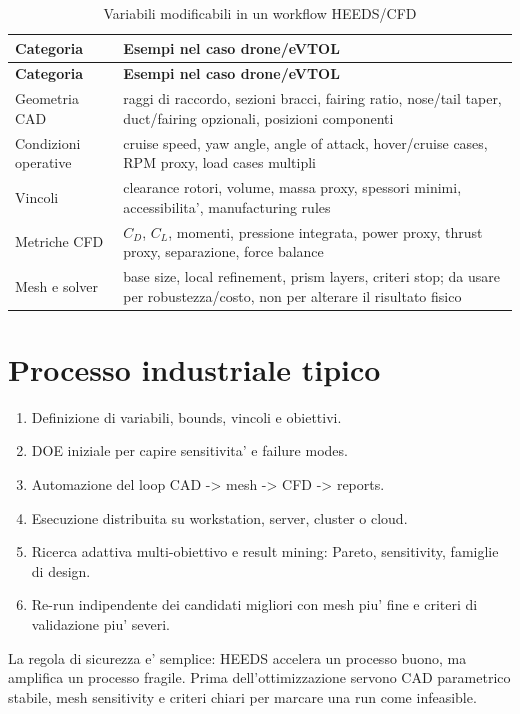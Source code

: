 \begin{longtable}{P{4cm} P{10cm}}
\caption{Variabili modificabili in un workflow HEEDS/CFD}\\
\toprule
\textbf{Categoria} & \textbf{Esempi nel caso drone/eVTOL} \\
\midrule
\endfirsthead
\toprule
\textbf{Categoria} & \textbf{Esempi nel caso drone/eVTOL} \\
\midrule
\endhead
Geometria CAD & raggi di raccordo, sezioni bracci, fairing ratio, nose/tail taper, duct/fairing opzionali, posizioni componenti \\
Condizioni operative & cruise speed, yaw angle, angle of attack, hover/cruise cases, RPM proxy, load cases multipli \\
Vincoli & clearance rotori, volume, massa proxy, spessori minimi, accessibilita', manufacturing rules \\
Metriche CFD & $C_D$, $C_L$, momenti, pressione integrata, power proxy, thrust proxy, separazione, force balance \\
Mesh e solver & base size, local refinement, prism layers, criteri stop; da usare per robustezza/costo, non per alterare il risultato fisico \\
\bottomrule
\end{longtable}

\section{Processo industriale tipico}

\begin{enumerate}
    \item Definizione di variabili, bounds, vincoli e obiettivi.
    \item DOE iniziale per capire sensitivita' e failure modes.
    \item Automazione del loop CAD -> mesh -> CFD -> reports.
    \item Esecuzione distribuita su workstation, server, cluster o cloud.
    \item Ricerca adattiva multi-obiettivo e result mining: Pareto, sensitivity, famiglie di design.
    \item Re-run indipendente dei candidati migliori con mesh piu' fine e criteri di validazione piu' severi.
\end{enumerate}

La regola di sicurezza e' semplice: HEEDS accelera un processo buono, ma amplifica un processo fragile. Prima dell'ottimizzazione servono CAD parametrico stabile, mesh sensitivity e criteri chiari per marcare una run come infeasible.
